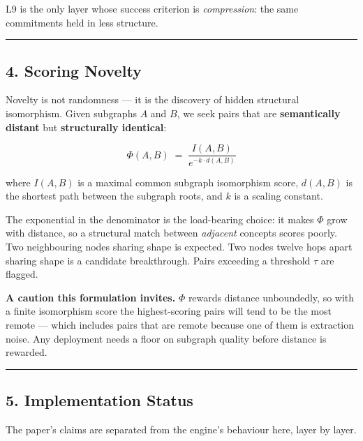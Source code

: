 \documentclass[
  11pt,
  a4paper,
]{article}
\begin{document}
L9 is the only layer whose success criterion is \emph{compression}: the
same commitments held in less structure.

\begin{center}\rule{0.5\linewidth}{0.5pt}\end{center}

\subsection{4. Scoring Novelty}\label{scoring-novelty}

Novelty is not randomness --- it is the discovery of hidden structural
isomorphism. Given subgraphs \(A\) and \(B\), we seek pairs that are
\textbf{semantically distant} but \textbf{structurally identical}:

\[
\Phi(A, B) \;=\; \frac{I(A, B)}{e^{-k \cdot d(A, B)}}
\]

where \(I(A,B)\) is a maximal common subgraph isomorphism score,
\(d(A,B)\) is the shortest path between the subgraph roots, and \(k\) is
a scaling constant.

The exponential in the denominator is the load-bearing choice: it makes
\(\Phi\) grow with distance, so a structural match between
\emph{adjacent} concepts scores poorly. Two neighbouring nodes sharing
shape is expected. Two nodes twelve hops apart sharing shape is a
candidate breakthrough. Pairs exceeding a threshold \(\tau\) are
flagged.

\textbf{A caution this formulation invites.} \(\Phi\) rewards distance
unboundedly, so with a finite isomorphism score the highest-scoring
pairs will tend to be the most remote --- which includes pairs that are
remote because one of them is extraction noise. Any deployment needs a
floor on subgraph quality before distance is rewarded.

\begin{center}\rule{0.5\linewidth}{0.5pt}\end{center}

\subsection{5. Implementation Status}\label{implementation-status}

The paper's claims are separated from the engine's behaviour here, layer
by layer.
\end{document}
